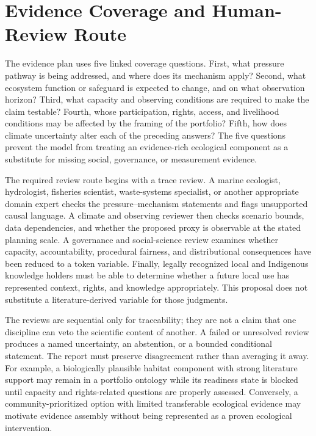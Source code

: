 \documentclass[conference]{IEEEtran}
\begin{document}
\section{Evidence Coverage and Human-Review Route}

The evidence plan uses five linked coverage questions. First, what pressure pathway is being addressed, and where does its mechanism apply? Second, what ecosystem function or safeguard is expected to change, and on what observation horizon? Third, what capacity and observing conditions are required to make the claim testable? Fourth, whose participation, rights, access, and livelihood conditions may be affected by the framing of the portfolio? Fifth, how does climate uncertainty alter each of the preceding answers? The five questions prevent the model from treating an evidence-rich ecological component as a substitute for missing social, governance, or measurement evidence.

The required review route begins with a trace review. A marine ecologist, hydrologist, fisheries scientist, waste-systems specialist, or another appropriate domain expert checks the pressure--mechanism statements and flags unsupported causal language. A climate and observing reviewer then checks scenario bounds, data dependencies, and whether the proposed proxy is observable at the stated planning scale. A governance and social-science review examines whether capacity, accountability, procedural fairness, and distributional consequences have been reduced to a token variable. Finally, legally recognized local and Indigenous knowledge holders must be able to determine whether a future local use has represented context, rights, and knowledge appropriately. This proposal does not substitute a literature-derived variable for those judgments.

The reviews are sequential only for traceability; they are not a claim that one discipline can veto the scientific content of another. A failed or unresolved review produces a named uncertainty, an abstention, or a bounded conditional statement. The report must preserve disagreement rather than averaging it away. For example, a biologically plausible habitat component with strong literature support may remain in a portfolio ontology while its readiness state is blocked until capacity and rights-related questions are properly assessed. Conversely, a community-prioritized option with limited transferable ecological evidence may motivate evidence assembly without being represented as a proven ecological intervention.
\end{document}
